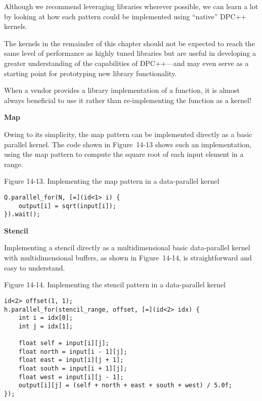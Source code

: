 Although we recommend leveraging libraries wherever possible, we can learn a lot by looking at how each pattern could be implemented using “native” DPC++ kernels.\par

The kernels in the remainder of this chapter should not be expected to reach the same level of performance as highly tuned libraries but are useful in developing a greater understanding of the capabilities of DPC++—and may even serve as a starting point for prototyping new library functionality.\par

\begin{tcolorbox}[colback=blue!5!white,colframe=blue!75!black, title=USE VENDOR-PROVIDED LIBRARIES!]
When a vendor provides a library implementation of a function, it is almost always beneficial to use it rather than re-implementing the function as a kernel!
\end{tcolorbox}

\hspace*{\fill} \par %
\textbf{Map}

Owing to its simplicity, the map pattern can be implemented directly as a basic parallel kernel. The code shown in Figure 14-13 shows such an implementation, using the map pattern to compute the square root of each input element in a range.\par

\hspace*{\fill} \par %
Figure 14-13. Implementing the map pattern in a data-parallel kernel
\begin{lstlisting}[caption={}]
Q.parallel_for(N, [=](id<1> i) {
	output[i] = sqrt(input[i]);
}).wait();
\end{lstlisting}

\hspace*{\fill} \par %
\textbf{Stencil}

Implementing a stencil directly as a multidimensional basic data-parallel kernel with multidimensional buffers, as shown in Figure 14-14, is straightforward and easy to understand.\par

\hspace*{\fill} \par %
Figure 14-14. Implementing the stencil pattern in a data-parallel kernel
\begin{lstlisting}[caption={}]
id<2> offset(1, 1);
h.parallel_for(stencil_range, offset, [=](id<2> idx) {
	int i = idx[0];
	int j = idx[1];
	
	float self = input[i][j];
	float north = input[i - 1][j];
	float east = input[i][j + 1];
	float south = input[i + 1][j];
	float west = input[i][j - 1];
	output[i][j] = (self + north + east + south + west) / 5.0f;
});
\end{lstlisting}

